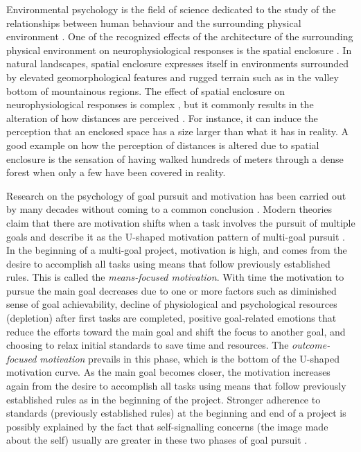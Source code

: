 Environmental psychology is the field of science dedicated to the study of the relationships between human 
behaviour and the surrounding physical environment \cite{BonnesEtAl2002}. One of the recognized effects of the 
architecture of the surrounding physical environment on neurophysiological responses is the spatial enclosure 
\cite{EpsteinEtAl1998}. In natural landscapes, spatial enclosure expresses itself in environments surrounded by
elevated geomorphological features and rugged terrain such as in the valley bottom of mountainous regions. The 
effect of spatial enclosure on neurophysiological responses is complex \cite{StampsEtAl2004}, but it commonly 
results in the alteration of how distances are perceived \cite{Coeterier1994}. For instance, it can induce the 
perception that an enclosed space has a size larger than what it has in reality. A good example on how the 
perception of distances is altered due to spatial enclosure is the sensation of having walked hundreds of 
meters 
through a dense forest when only a few have been covered in reality.

Research on the psychology of goal pursuit and motivation has been carried out by many decades without coming 
to a common conclusion \cite{Toure-TilleryEtAl2011a, Hull1932}. Modern theories claim that there are motivation
shifts when a task involves the pursuit of multiple goals and describe it as the U-shaped motivation pattern of 
multi-goal
pursuit \cite{BonezziEtAl2011, Toure-TilleryEtAl2011a}. In the beginning of a multi-goal project, motivation 
is high, and comes from the desire to accomplish all tasks using means that follow previously established 
rules. This is called the \emph{means-focused motivation}. With time the motivation to pursue the main goal 
decreases due to one or more factors such as diminished sense of goal achievability, decline 
of physiological and psychological resources (depletion) after first tasks are completed, positive goal-related 
emotions that reduce the efforts toward the main goal and shift the focus to another goal, and choosing to 
relax initial standards to save time and resources. The \emph{outcome-focused motivation} prevails in this 
phase, which is the bottom of the U-shaped motivation curve. As the main goal becomes closer, the motivation 
increases again from the desire to accomplish all tasks using means that follow 
previously established rules as in the beginning of the project. Stronger adherence to standards (previously 
established rules) at the beginning and end of a project is possibly explained by the fact that self-signalling 
concerns (the image made about the self) usually are greater in these two phases of goal pursuit 
\cite{Toure-TilleryEtAl2011}.

